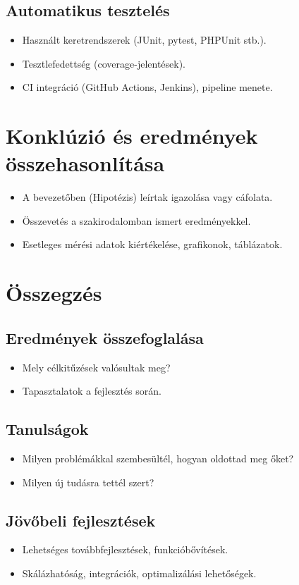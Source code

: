 \documentclass{thesis-ekf}
\begin{document}
\section{Automatikus tesztelés}
\begin{itemize}
  \item Használt keretrendszerek (JUnit, pytest, PHPUnit stb.).
  \item Tesztlefedettség (coverage-jelentések).
  \item CI integráció (GitHub Actions, Jenkins), pipeline menete.
\end{itemize}

\chapter{Konklúzió és eredmények összehasonlítása}
\begin{itemize}
  \item A bevezetőben (Hipotézis) leírtak igazolása vagy cáfolata.
  \item Összevetés a szakirodalomban ismert eredményekkel.
  \item Esetleges mérési adatok kiértékelése, grafikonok, táblázatok.
\end{itemize}

\chapter{Összegzés}

\section{Eredmények összefoglalása}
\begin{itemize}
  \item Mely célkitűzések valósultak meg?
  \item Tapasztalatok a fejlesztés során.
\end{itemize}

\section{Tanulságok}
\begin{itemize}
  \item Milyen problémákkal szembesültél, hogyan oldottad meg őket?
  \item Milyen új tudásra tettél szert?
\end{itemize}

\section{Jövőbeli fejlesztések}
\begin{itemize}
  \item Lehetséges továbbfejlesztések, funkcióbővítések.
  \item Skálázhatóság, integrációk, optimalizálási lehetőségek.
\end{itemize}
\end{document}
